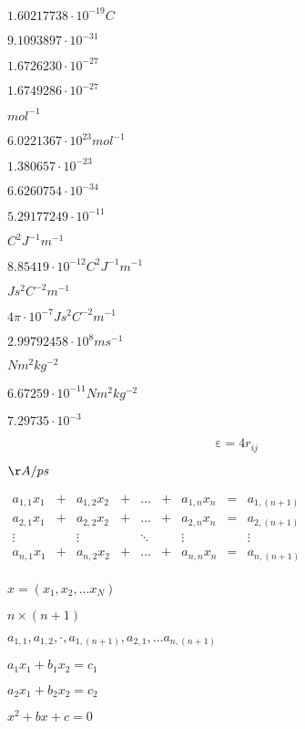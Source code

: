 \documentclass{article}
\begin{document}
$1.60217738 \cdot 10^{-19} C$
\pagebreak

$9.1093897 \cdot 10^{-31}$
\pagebreak

$1.6726230 \cdot 10^{-27}$
\pagebreak

$1.6749286 \cdot 10^{-27}$
\pagebreak

$mol^{-1}$
\pagebreak

$6.0221367 \cdot 10^{23} mol^{-1}$
\pagebreak

$1.380657 \cdot 10^{-23}$
\pagebreak

$6.6260754 \cdot 10^{-34}$
\pagebreak

$5.29177249 \cdot 10^{-11}$
\pagebreak

$C^2J^{-1}m^{-1}$
\pagebreak

$8.85419 \cdot 10^{-12} C^2J^{-1}m^{-1}$
\pagebreak

$Js^2C^{-2}m^{-1}$
\pagebreak

$4\pi \cdot 10^{-7} Js^2C^{-2}m^{-1}$
\pagebreak

$2.99792458 \cdot 10^8 ms^{-1}$
\pagebreak

$Nm^2kg^{-2}$
\pagebreak

$6.67259 \cdot 10^{-11} Nm^2kg^{-2}$
\pagebreak

$7.29735 \cdot 10^{-3}$
\pagebreak

\[\mathrm \varepsilon = 4 r_{ij}\nonumber \]
\pagebreak

$ {\AA}/ps $
\pagebreak

$ \begin{array}{ccccccccc} a_{1,1} x_1 & + & a_{1,2} x_2 & + & \ldots & + & a_{1,n} x_n & = & a_{1,(n+1)} \\ a_{2,1} x_1 & + & a_{2,2} x_2 & + & \ldots & + & a_{2,n} x_n & = & a_{2,(n+1)} \\ \vdots & & \vdots & & \ddots & & \vdots & & \vdots \\ a_{n,1} x_1 & + & a_{n,2} x_2 & + & \ldots & + & a_{n,n} x_n & = & a_{n,(n+1)} \\ \end{array} $
\pagebreak

$x = (x_1, x_2,\ldots x_N)$
\pagebreak

$n\times(n+1)$
\pagebreak

$ a_{1,1}, a_{1,2}, \cdot, a_{1,(n+1)}, a_{2,1}, \ldots a_{n,(n+1)} $
\pagebreak

$a_1 x_1 + b_1 x_2 = c_1$
\pagebreak

$a_2 x_1 + b_2 x_2 = c_2$
\pagebreak

$x^2 + b x + c = 0$
\pagebreak
\end{document}
